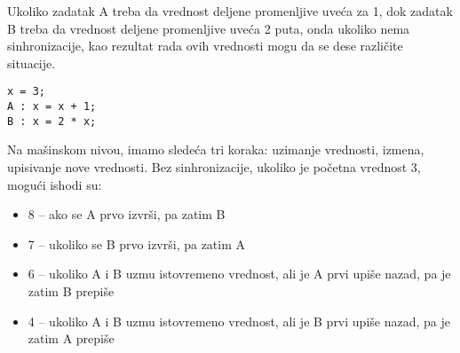 \documentclass[../main.tex]{subfiles}
\begin{document}
\begin{boxprimer}
Ukoliko zadatak A treba da vrednost deljene promenljive uveća za 1, dok zadatak B treba da vrednost deljene promenljive uveća 2 puta, onda ukoliko nema sinhronizacije, kao rezultat rada ovih vrednosti mogu da se dese različite situacije.

\begin{Verbatim}
x = 3;
A : x = x + 1;
B : x = 2 * x;
\end{Verbatim}

Na mašinskom nivou, imamo sledeća tri koraka: uzimanje vrednosti, izmena, upisivanje nove vrednosti. Bez sinhronizacije, ukoliko je početna vrednost 3, mogući ishodi su:
\begin{itemize}
\item 8 -- ako se A prvo izvrši, pa zatim B
\item 7 -- ukoliko se B prvo izvrši, pa zatim A
\item 6 -- ukoliko A i B uzmu istovremeno vrednost, ali je A prvi upiše nazad, pa je zatim B prepiše
\item 4 -- ukoliko A i B uzmu istovremeno vrednost, ali je B prvi upiše nazad, pa je zatim A prepiše
\end{itemize}
\end{boxprimer}
\end{document}
